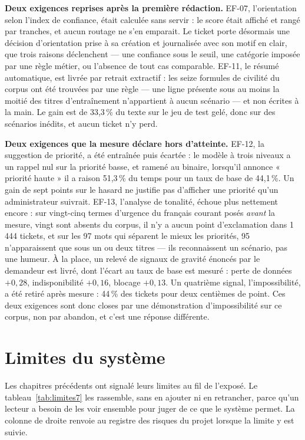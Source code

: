 \textbf{Deux exigences reprises après la première rédaction.} EF-07, l'orientation selon l'index
de confiance, était calculée sans servir : le score était affiché et rangé par tranches, et aucun
routage ne s'en emparait. Le ticket porte désormais une décision d'orientation prise à sa création
et journalisée avec son motif en clair, que trois raisons déclenchent — une confiance sous le seuil,
une catégorie imposée par une règle métier, ou l'absence de tout cas comparable. EF-11, le résumé
automatique, est livrée par retrait extractif : les seize formules de civilité du corpus ont été
trouvées par une règle — une ligne présente sous au moins la moitié des titres d'entraînement
n'appartient à aucun scénario — et non écrites à la main. Le gain est de 33,3\,\% du texte sur le
jeu de test gelé, donc sur des scénarios inédits, et aucun ticket n'y perd.

\textbf{Deux exigences que la mesure déclare hors d'atteinte.} EF-12, la suggestion de priorité, a
été entraînée puis écartée : le modèle à trois niveaux a un rappel nul sur la priorité basse, et
ramené au binaire, lorsqu'il annonce « priorité haute » il a raison 51,3\,\% du temps pour un taux
de base de 44,1\,\%. Un gain de sept points sur le hasard ne justifie pas d'afficher une priorité
qu'un administrateur suivrait. EF-13, l'analyse de tonalité, échoue plus nettement encore : sur
vingt-cinq termes d'urgence du français courant posés \emph{avant} la mesure, vingt sont absents du
corpus, il n'y a aucun point d'exclamation dans 1\,444 tickets, et sur les 97 mots qui séparent le
mieux les priorités, 95 n'apparaissent que sous un ou deux titres — ils reconnaissent un scénario,
pas une humeur. À la place, un relevé de signaux de gravité énoncés par le demandeur est livré,
dont l'écart au taux de base est mesuré : perte de données $+0{,}28$, indisponibilité $+0{,}16$,
blocage $+0{,}13$. Un quatrième signal, l'impossibilité, a été retiré après mesure : 44\,\% des
tickets pour deux centièmes de point. Ces deux exigences sont donc closes par une démonstration
d'impossibilité sur ce corpus, non par abandon, et c'est une réponse différente.

\section{Limites du système}

\label{sec:limites7}

Les chapitres précédents ont signalé leurs limites au fil de l'exposé. Le
tableau~\ref{tab:limites7} les rassemble, sans en ajouter ni en retrancher, parce qu'un lecteur a
besoin de les voir ensemble pour juger de ce que le système permet. La colonne de droite renvoie au
registre des risques du projet lorsque la limite y est suivie.

